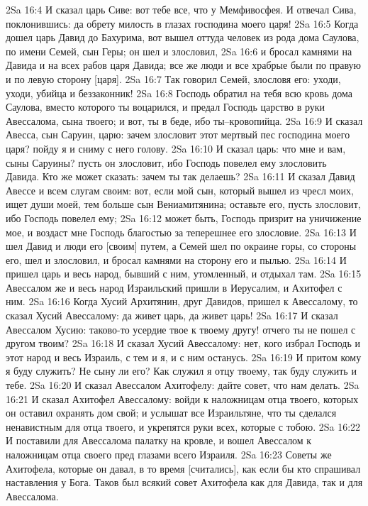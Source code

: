 2Sa 16:4  И сказал царь Сиве: вот тебе все, что у Мемфивосфея. И отвечал Сива, поклонившись: да обрету милость в глазах господина моего царя!
2Sa 16:5  Когда дошел царь Давид до Бахурима, вот вышел оттуда человек из рода дома Саулова, по имени Семей, сын Геры; он шел и злословил,
2Sa 16:6  и бросал камнями на Давида и на всех рабов царя Давида; все же люди и все храбрые были по правую и по левую сторону [царя].
2Sa 16:7  Так говорил Семей, злословя его: уходи, уходи, убийца и беззаконник!
2Sa 16:8  Господь обратил на тебя всю кровь дома Саулова, вместо которого ты воцарился, и предал Господь царство в руки Авессалома, сына твоего; и вот, ты в беде, ибо ты--кровопийца.
2Sa 16:9  И сказал Авесса, сын Саруин, царю: зачем злословит этот мертвый пес господина моего царя? пойду я и сниму с него голову.
2Sa 16:10  И сказал царь: что мне и вам, сыны Саруины? пусть он злословит, ибо Господь повелел ему злословить Давида. Кто же может сказать: зачем ты так делаешь?
2Sa 16:11  И сказал Давид Авессе и всем слугам своим: вот, если мой сын, который вышел из чресл моих, ищет души моей, тем больше сын Вениамитянина; оставьте его, пусть злословит, ибо Господь повелел ему;
2Sa 16:12  может быть, Господь призрит на уничижение мое, и воздаст мне Господь благостью за теперешнее его злословие.
2Sa 16:13  И шел Давид и люди его [своим] путем, а Семей шел по окраине горы, со стороны его, шел и злословил, и бросал камнями на сторону его и пылью.
2Sa 16:14  И пришел царь и весь народ, бывший с ним, утомленный, и отдыхал там.
2Sa 16:15  Авессалом же и весь народ Израильский пришли в Иерусалим, и Ахитофел с ним.
2Sa 16:16  Когда Хусий Архитянин, друг Давидов, пришел к Авессалому, то сказал Хусий Авессалому: да живет царь, да живет царь!
2Sa 16:17  И сказал Авессалом Хусию: таково-то усердие твое к твоему другу! отчего ты не пошел с другом твоим?
2Sa 16:18  И сказал Хусий Авессалому: нет, кого избрал Господь и этот народ и весь Израиль, с тем и я, и с ним останусь.
2Sa 16:19  И притом кому я буду служить? Не сыну ли его? Как служил я отцу твоему, так буду служить и тебе.
2Sa 16:20  И сказал Авессалом Ахитофелу: дайте совет, что нам делать.
2Sa 16:21  И сказал Ахитофел Авессалому: войди к наложницам отца твоего, которых он оставил охранять дом свой; и услышат все Израильтяне, что ты сделался ненавистным для отца твоего, и укрепятся руки всех, которые с тобою.
2Sa 16:22  И поставили для Авессалома палатку на кровле, и вошел Авессалом к наложницам отца своего пред глазами всего Израиля.
2Sa 16:23  Советы же Ахитофела, которые он давал, в то время [считались], как если бы кто спрашивал наставления у Бога. Таков был всякий совет Ахитофела как для Давида, так и для Авессалома.
